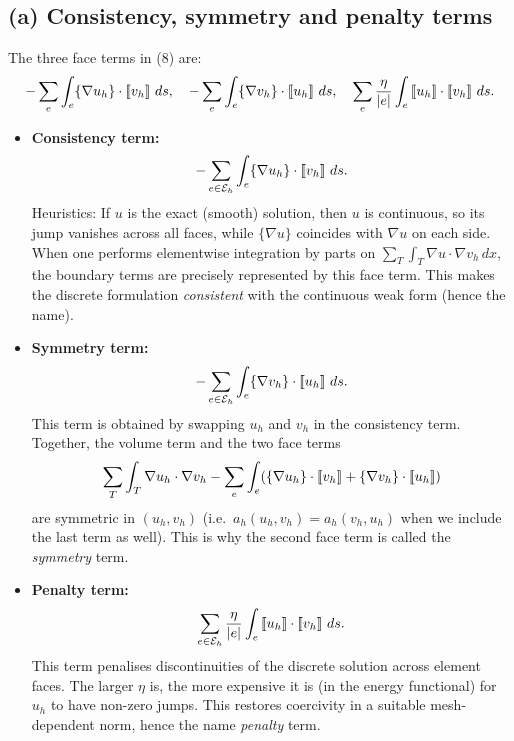 \subsection*{(a) Consistency, symmetry and penalty terms}
The three face terms in (8) are:
\[
    - \sum_{e} \int_e \{\nabla u_h\}\cdot \jump{v_h}\,ds,
    \quad
    - \sum_{e} \int_e \{\nabla v_h\}\cdot \jump{u_h}\,ds,
    \quad
    \sum_{e} \frac{\eta}{|e|} \int_e \jump{u_h}\cdot \jump{v_h}\,ds.
\]
\begin{itemize}
    \item \textbf{Consistency term:}
          \[
              - \sum_{e\in \mathcal{E}_h} \int_e \{\nabla u_h\}\cdot \left[\!\left[ v_h \right]\!\right]\,ds.
          \]
          Heuristics: If $u$ is the exact (smooth) solution, then $u$ is continuous, so its
          jump vanishes across all faces, while $\{\nabla u\}$ coincides with $\nabla u$
          on each side.
          When one performs elementwise integration by parts on
          $\sum_T \int_T \nabla u\cdot \nabla v_h\,dx$, the boundary terms are precisely
          represented by this face term. This makes the discrete formulation
          \emph{consistent} with the continuous weak form (hence the name).
    \item \textbf{Symmetry term:}
          \[
              - \sum_{e\in \mathcal{E}_h} \int_e \{\nabla v_h\}\cdot \left[\!\left[ u_h \right]\!\right]\,ds.
          \]
          This term is obtained by swapping $u_h$ and $v_h$ in the consistency term.
          Together, the volume term and the two face terms
          \[
              \sum_T \int_T \nabla u_h\cdot\nabla v_h
              - \sum_e \int_e (\{\nabla u_h\}\cdot\left[\!\left[ v_h \right]\!\right]
              + \{\nabla v_h\}\cdot\left[\!\left[ u_h \right]\!\right])
          \]
          are symmetric in $(u_h,v_h)$ (i.e.\ $a_h(u_h,v_h)=a_h(v_h,u_h)$ when we
          include the last term as well). This is why the second face term is called
          the \emph{symmetry} term.
    \item \textbf{Penalty term:}
          \[
              \sum_{e\in \mathcal{E}_h} \frac{\eta}{|e|} \int_e \left[\!\left[ u_h \right]\!\right]\cdot \left[\!\left[ v_h \right]\!\right]\,ds.
          \]
          This term penalises discontinuities of the discrete solution across element faces.
          The larger $\eta$ is, the more expensive it is (in the energy functional) for $u_h$
          to have non-zero jumps. This restores coercivity in a suitable mesh-dependent norm,
          hence the name \emph{penalty} term.
\end{itemize}
